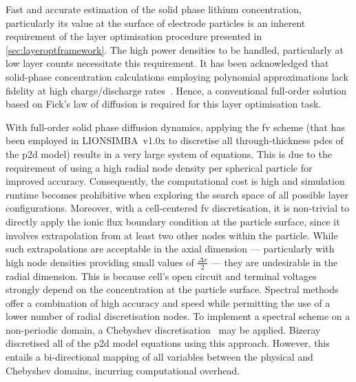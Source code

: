 Fast  and  accurate  estimation  of   the  solid  phase  lithium  concentration,
particularly  its   value  at   the  surface  of   electrode  particles   is  an
inherent  requirement   of  the   layer  optimisation  procedure   presented  in
\cref{sec:layeroptframework}.   The  high   power  densities   to  be   handled,
particularly  at  low   layer  counts  necessitate  this   requirement.  It  has
been   acknowledged  that   solid-phase  concentration   calculations  employing
polynomial    approximations   lack    fidelity    at   high    charge/discharge
rates~\cite{Santhanagopalan2006}.  Hence,  a  conventional  full-order  solution
based on Fick's law of diffusion is required for this layer optimisation task.

With full-order  solid phase  diffusion dynamics,  applying the  \gls{fv} scheme
(that has been  employed in LIONSIMBA~v1.0x to  discretise all through-thickness
\gls{pde}s of the \gls{p2d} model) results  in a very large system of equations.
This is due to the requirement of using a high radial node density per spherical
particle for improved accuracy. Consequently, the computational cost is high and
simulation  runtime  becomes prohibitive  when  exploring  the search  space  of
all  possible  layer configurations.  Moreover,  with  a cell-centered  \gls{fv}
discretisation,  it is  non-trivial to  directly apply  the ionic  flux boundary
condition at the particle surface, since it involves extrapolation from at least
two other nodes within the particle. While such extrapolations are acceptable in
the axial  dimension --- particularly  with high node densities  providing small
values of $\frac{\Delta x}{2}$ --- they are undesirable in the radial dimension.
This  is because  cell's  open  circuit and  terminal  voltages strongly  depend
on  the  concentration  at  the  particle  surface.  Spectral  methods  offer  a
combination  of high  accuracy and  speed while  permitting the  use of  a lower
number  of radial  discretisation nodes.  To implement  a spectral  scheme on  a
non-periodic  domain,  a  Chebyshev discretisation~\cite{Trefethen2000}  may  be
applied.  Bizeray~\etal{}~\cite{Bizeray2015} discretised  all  of the  \gls{p2d}
model  equations using  this approach.  However, this  entails a  bi-directional
mapping of all  variables between the physical and  Chebyshev domains, incurring
computational overhead.


